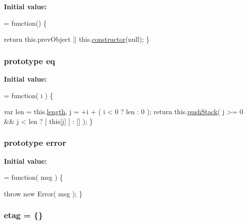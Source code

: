 {\bfseries Initial value\-:}
\begin{DoxyCode}
= \textcolor{keyword}{function}() \{


        \textcolor{keywordflow}{return} this.prevObject || this.\hyperlink{jquery-1_810_82-vsdoc_8js_ac8c7ab4467fc25f40e85c72221a1f10b}{constructor}(null);
    \}
\end{DoxyCode}
\hypertarget{jquery-1_810_82-vsdoc_8js_a57adf3cfa88f689534e187b77491d52d}{
\subsubsection[{eq}]{ {\bf prototype} eq}}\label{jquery-1_810_82-vsdoc_8js_a57adf3cfa88f689534e187b77491d52d}
{\bfseries Initial value\-:}
\begin{DoxyCode}
= \textcolor{keyword}{function}( i ) \{


        var len = this.\hyperlink{jquery-1_810_82-vsdoc_8js_aa7de35d58da66d9944ab9cbe82c19640}{length},
            j = +i + ( i < 0 ? len : 0 );
        \textcolor{keywordflow}{return} this.\hyperlink{jquery-1_810_82-vsdoc_8js_afc3a7db1ef2b526338c06c07cecccd44}{pushStack}( j >= 0 && j < len ? [ \textcolor{keyword}{this}[j] ] : [] );
    \}
\end{DoxyCode}
\hypertarget{jquery-1_810_82-vsdoc_8js_acd25716dc66c2c57df2fc97807ffbddf}{
\subsubsection[{error}]{ {\bf prototype} error}}\label{jquery-1_810_82-vsdoc_8js_acd25716dc66c2c57df2fc97807ffbddf}
{\bfseries Initial value\-:}
\begin{DoxyCode}
= \textcolor{keyword}{function}( msg ) \{


        \textcolor{keywordflow}{throw} \textcolor{keyword}{new} Error( msg );
    \}
\end{DoxyCode}
\hypertarget{jquery-1_810_82-vsdoc_8js_afef53404a8ff79eab1ee39c165d6ba37}{
\subsubsection[{etag}]{ etag = \{\}}}\label{jquery-1_810_82-vsdoc_8js_afef53404a8ff79eab1ee39c165d6ba37}
